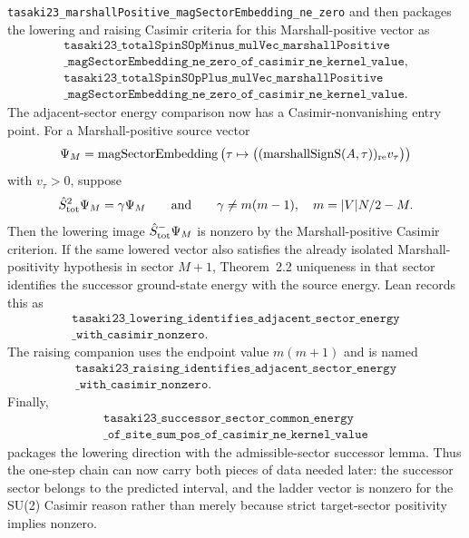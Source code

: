 \documentclass[a4paper,11pt]{article}
\begin{document}
\texttt{tasaki23\_marshallPositive\_magSectorEmbedding\_ne\_zero} and
then packages the lowering and raising Casimir criteria for this
Marshall-positive vector as
\[
\begin{gathered}
\texttt{tasaki23\_totalSpinSOpMinus\_mulVec\_marshallPositive}\\
\texttt{\_magSectorEmbedding\_ne\_zero\_of\_casimir\_ne\_kernel\_value},\\
\texttt{tasaki23\_totalSpinSOpPlus\_mulVec\_marshallPositive}\\
\texttt{\_magSectorEmbedding\_ne\_zero\_of\_casimir\_ne\_kernel\_value}.
\end{gathered}
\]
The adjacent-sector energy comparison now has a Casimir-nonvanishing
entry point.  For a Marshall-positive source vector
\[
  \Psi_M=
  \mathrm{magSectorEmbedding}
    \left(\tau\mapsto
      \bigl((\mathrm{marshallSignS}(A,\tau))_{\rm re} v_\tau\bigr)
    \right)
\]
with \(v_\tau>0\), suppose
\[
  \hat S_{\rm tot}^2\Psi_M=\gamma\Psi_M
  \qquad\text{and}\qquad
  \gamma\ne m(m-1),
  \quad m=|V|N/2-M .
\]
Then the lowering image \(\hat S^-_{\rm tot}\Psi_M\) is nonzero by
the Marshall-positive Casimir criterion.  If the same lowered vector
also satisfies the already isolated Marshall-positivity hypothesis in
sector \(M+1\), Theorem~2.2 uniqueness in that sector identifies the
successor ground-state energy with the source energy.  Lean records
this as
\[
\begin{gathered}
\texttt{tasaki23\_lowering\_identifies\_adjacent\_sector\_energy}\\
\texttt{\_with\_casimir\_nonzero}.
\end{gathered}
\]
The raising companion uses the endpoint value \(m(m+1)\) and is named
\[
\begin{gathered}
\texttt{tasaki23\_raising\_identifies\_adjacent\_sector\_energy}\\
\texttt{\_with\_casimir\_nonzero}.
\end{gathered}
\]
Finally,
\[
\begin{gathered}
\texttt{tasaki23\_successor\_sector\_common\_energy}\\
\texttt{\_of\_site\_sum\_pos\_of\_casimir\_ne\_kernel\_value}
\end{gathered}
\]
packages the lowering direction with the admissible-sector successor
lemma.  Thus the one-step chain can now carry both pieces of data
needed later: the successor sector belongs to the predicted interval,
and the ladder vector is nonzero for the SU(2) Casimir reason rather
than merely because strict target-sector positivity implies nonzero.
\end{document}
